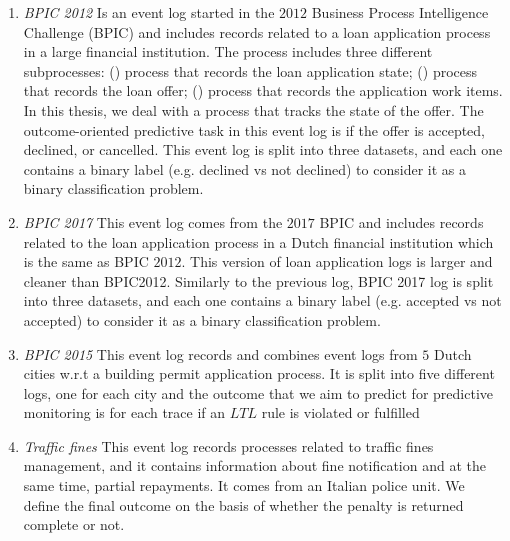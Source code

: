 \begin{enumerate}
	\item \textit{BPIC 2012 }
	 Is an event log started in the $2012$ Business Process Intelligence Challenge (BPIC) and includes records related to a loan application process in a large financial institution. The process includes three different subprocesses: () process that records the loan application state; () process that records the loan offer; () process that records the application work items. In this thesis, we deal with a process that tracks the state of the offer. The outcome-oriented predictive task in this event log is if the offer is accepted, declined, or cancelled. This event log is split into three datasets, and each one contains a binary label (e.g. declined vs not declined) to consider it as a binary classification problem. 
	
	\item \textit{BPIC 2017 }
	This event log comes from the $2017$ BPIC and includes records related to the loan application process in a Dutch financial institution which is the same as BPIC $2012$. This version of loan application logs is larger and cleaner than BPIC2012. Similarly to the previous log, BPIC 2017 log is split into three datasets, and each one contains a binary label (e.g. accepted vs not accepted) to consider it as a binary classification problem. 
	
	\item \textit{BPIC 2015 }
	This event log records and combines event logs from $5$ Dutch cities w.r.t a building permit application process. It is split into five different logs, one for each city and the outcome that we aim to predict for predictive monitoring is for each trace if an $LTL$ rule \cite{pnueli1977temporal} is violated or fulfilled \cite{di2017clustering, gunther2014xes}
	
	\item \textit{Traffic fines }
	This event log records processes related to traffic fines management, and it contains information about fine notification and at the same time, partial repayments. It comes from an Italian police unit. We define the final outcome on the basis of whether the penalty is returned complete or not.
	
	
	
	

\end{enumerate}
